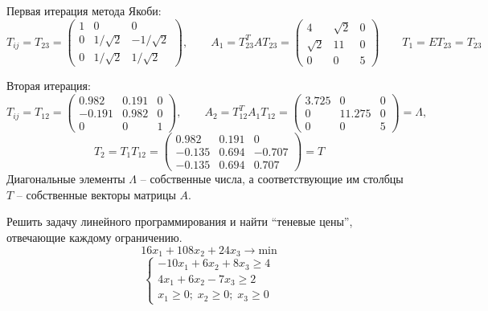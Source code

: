 Первая итерация метода Якоби:
\begin{equation*}
    T_{ij} = T_{23} =
    \begin{pmatrix}
        1 & 0 & 0\\
        0 & 1/\sqrt{2} & -1/\sqrt{2}\\
        0 & 1/\sqrt{2} & 1/\sqrt{2}
    \end{pmatrix},
    \qquad
    A_1 = T_{23}^T A T_{23} =
    \begin{pmatrix}
        4 & \sqrt{2} & 0\\
        \sqrt{2} & 11 & 0\\
        0 & 0 & 5
    \end{pmatrix}
    \qquad
    T_1 = E T_{23} = T_{23}
\end{equation*}

Вторая итерация:
\begin{equation*}
    T_{ij} = T_{12} =
    \begin{pmatrix}
        0.982 & 0.191 & 0\\
        -0.191 & 0.982 & 0\\
        0 & 0 & 1
    \end{pmatrix},
    \qquad
    A_2 = T_{12}^T A_1 T_{12} =
    \begin{pmatrix}
        3.725 & 0 & 0\\
        0 & 11.275 & 0\\
        0 & 0 & 5
    \end{pmatrix}
     = \Lambda,
\end{equation*}
\begin{equation*}
    T_2 = T_1 T_{12} =
    \begin{pmatrix}
        0.982 & 0.191 & 0\\
        -0.135 & 0.694 & -0.707\\
        -0.135 & 0.694 & 0.707
    \end{pmatrix}
    = T
\end{equation*}
Диагональные элементы $\Lambda$ -- собственные числа, а соответствующие им
столбцы $T$ -- собственные векторы матрицы $A$.


\begin{problem}
    Решить задачу линейного программирования и найти ``теневые цены'', отвечающие
    каждому ограничению.
    \begin{equation*}
        16x_1 + 108x_2 + 24x_3 \to \text{min}
    \end{equation*}
    \begin{equation*}
        \begin{cases}
            -10x_1 + 6x_2 + 8x_3 \geq 4\\
            4x_1 + 6x_2 - 7x_3 \geq 2\\
            x_1 \geq 0; \; x_2 \geq 0; \; x_3 \geq 0
        \end{cases}
    \end{equation*}
\end{problem}

